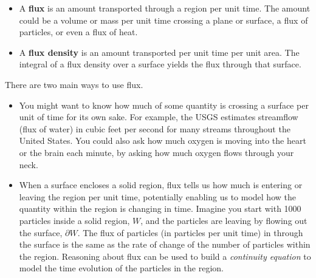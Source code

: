\documentclass[12pt,letterpaper,noanswers]{exam}
\begin{document}



\begin{tcolorbox}
\begin{itemize}
\itemsep0em
    \item A \textbf{flux} is an amount transported through a region per unit time.  The amount could be a volume or mass per unit time crossing a plane or surface, a flux of particles, or even a flux of heat.
    \item A \textbf{flux density} is an amount transported per unit time per unit area.  The integral of a flux density over a surface yields the flux through that surface.
\end{itemize}

There are two main ways to use flux.
\begin{itemize}
\itemsep0em
    \item You might want to know how much of some quantity is crossing a surface per unit of time for its own sake.  For example, the USGS estimates streamflow (flux of water) in cubic feet per second for many streams throughout the United States.  You could also ask how much oxygen is moving into the heart or the brain each minute, by asking how much oxygen flows through your neck.
    \item When a surface encloses a solid region, flux tells us how much is entering or leaving the region per unit time, potentially enabling us to model how the quantity within the region is changing in time.  Imagine you start with 1000 particles inside a solid region, $W$, and the particles are leaving by flowing out the surface, $\partial W$. The flux of particles (in particles per unit time) in through the surface is the same as the rate of change of the number of particles within the region.  Reasoning about flux can be used to build a \emph{continuity equation} to model the time evolution of the particles in the region.
\end{itemize}
\end{tcolorbox}
\end{document}
